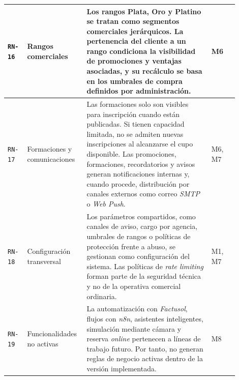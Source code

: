 {\begin{supertabular}{|>{\raggedright\arraybackslash}p{0.08\linewidth}|>{\raggedright\arraybackslash}p{0.20\linewidth}|>{\raggedright\arraybackslash}p{0.51\linewidth}|>{\raggedright\arraybackslash}p{0.11\linewidth}|}
\texttt{RN-16} & Rangos comerciales & Los rangos Plata, Oro y Platino se tratan como segmentos comerciales jerárquicos. La pertenencia del cliente a un rango condiciona la visibilidad de promociones y ventajas asociadas, y su recálculo se basa en los umbrales de compra definidos por administración. & M6 \\
\hline

\texttt{RN-17} & Formaciones y comunicaciones & Las formaciones solo son visibles para inscripción cuando están publicadas. Si tienen capacidad limitada, no se admiten nuevas inscripciones al alcanzarse el cupo disponible. Las promociones, formaciones, recordatorios y avisos generan notificaciones internas y, cuando procede, distribución por canales externos como correo \textit{SMTP} o \textit{Web Push}. & M6, M7 \\
\hline

\texttt{RN-18} & Configuración transversal & Los parámetros compartidos, como canales de aviso, cargo por agencia, umbrales de rangos o políticas de protección frente a abuso, se gestionan como configuración del sistema. Las políticas de \textit{rate limiting} forman parte de la seguridad técnica y no de la operativa comercial ordinaria. & M1, M7 \\
\hline

\texttt{RN-19} & Funcionalidades no activas & La automatización con \textit{Factusol}, flujos con \textit{n8n}, asistentes inteligentes, simulación mediante cámara y reserva \textit{online} pertenecen a líneas de trabajo futuro. Por tanto, no generan reglas de negocio activas dentro de la versión implementada. & M8 \\
\hline
\end{supertabular}
}
